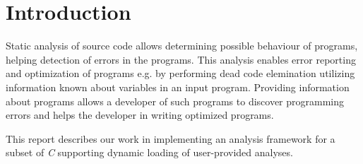 \section{Introduction}

Static analysis of source code allows determining possible behaviour of programs, helping detection of errors in the programs. This analysis enables error reporting and optimization of programs e.g. by performing dead code elemination utilizing information known about variables in an input program. Providing information about programs allows a developer of such programs to discover programming errors and helps the developer in writing optimized programs.  

\newpar This report describes our work in implementing an analysis framework for a subset of \textit{C} supporting dynamic loading of user-provided analyses. 
